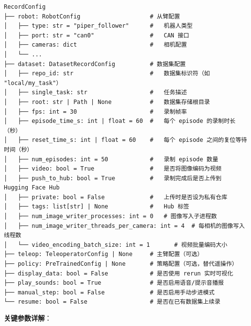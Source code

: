 \documentclass[UTF8,a4paper,11pt]{ctexart}
\begin{document}
{\begin{lstlisting}[language=text]
RecordConfig
├── robot: RobotConfig                    # 从臂配置
│   ├── type: str = "piper_follower"      #   机器人类型
│   ├── port: str = "can0"                #   CAN 接口
│   ├── cameras: dict                     #   相机配置
│   └── ...
├── dataset: DatasetRecordConfig          # 数据集配置
│   ├── repo_id: str                      #   数据集标识符（如 "local/my_task"）
│   ├── single_task: str                  #   任务描述
│   ├── root: str | Path | None           #   数据集存储根目录
│   ├── fps: int = 30                     #   录制帧率
│   ├── episode_time_s: int | float = 60  #   每个 episode 的录制时长（秒）
│   ├── reset_time_s: int | float = 60    #   每个 episode 之间的复位等待时间（秒）
│   ├── num_episodes: int = 50            #   录制 episode 数量
│   ├── video: bool = True                #   是否将图像编码为视频
│   ├── push_to_hub: bool = True          #   录制完成后是否上传到 Hugging Face Hub
│   ├── private: bool = False             #   上传时是否设为私有仓库
│   ├── tags: list[str] | None            #   Hub 标签
│   ├── num_image_writer_processes: int = 0   # 图像写入子进程数
│   ├── num_image_writer_threads_per_camera: int = 4  # 每相机的图像写入线程数
│   └── video_encoding_batch_size: int = 1       # 视频批量编码大小
├── teleop: TeleoperatorConfig | None     # 主臂配置（可选）
├── policy: PreTrainedConfig | None       # 策略配置（可选，替代遥操作）
├── display_data: bool = False            # 是否使用 rerun 实时可视化
├── play_sounds: bool = True              # 是否启用语音/提示音播报
├── manual_step: bool = False             # 是否启用手动步进模式
└── resume: bool = False                  # 是否在已有数据集上续录
\end{lstlisting}

\textbf{关键参数详解}：

}
\end{document}
